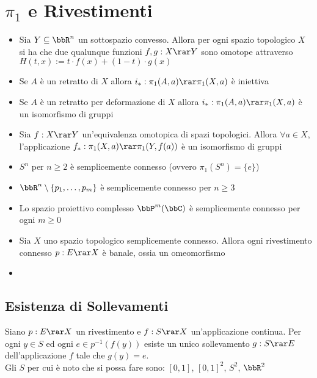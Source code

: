 \documentclass[a4paper,NoNotes,GeneralMath]{stdmdoc}
\begin{document}
	\section*{$\pi_1$ e Rivestimenti}
	\begin{itemize}
		\item Sia $Y \subseteq \bbR^n$ un sottospazio convesso. Allora per ogni spazio topologico $X$ si ha che due qualunque funzioni $f, g: X \rar Y$ sono omotope attraverso $H(t, x) := t \cdot f(x) + (1-t) \cdot g(x)$
		\item Se $A$ è un retratto di $X$ allora $i_*: \pi_1(A, a) \rar \pi_1(X, a)$ è iniettiva
		\item Se $A$ è un retratto per deformazione di $X$ allora $i_*: \pi_1(A, a) \rar \pi_1(X, a)$ è un isomorfismo di gruppi
		\item Sia $f: X \rar Y$ un'equivalenza omotopica di spazi topologici. Allora $\forall a \in X$, l'applicazione $f_*: \pi_1(X, a) \rar \pi_1(Y, f(a))$ è un isomorfismo di gruppi
		\item $S^n$ per $n \ge 2$ è semplicemente connesso (ovvero $\pi_1(S^n) = \{e\}$)
		\item $\bbR^n \setminus \{ p_1, \ldots, p_m \}$ è semplicemente connesso per $n \ge 3$
		\item Lo spazio proiettivo complesso $\bbP^m(\bbC)$ è semplicemente connesso per ogni $m \ge 0$
		\item Sia $X$ uno spazio topologico semplicemente connesso. Allora ogni rivestimento connesso $p: E \rar X$ è banale, ossia un omeomorfismo
		\item 
	\end{itemize}

	\subsection{Esistenza di Sollevamenti}
	Siano $p: E \rar X$ un rivestimento e $f: S \rar X$ un'applicazione continua. Per ogni $y \in S$ ed ogni $e \in p^{-1}(f(y))$ esiste un unico sollevamento $g: S \rar E$ dell'applicazione $f$ tale che $g(y) = e$. \\
	Gli $S$ per cui è noto che si possa fare sono: $[0, 1]$, $[0, 1]^2$, $S^2$, $\bbR^2$
\end{document}
